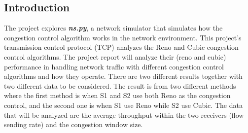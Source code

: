 \documentclass[12pt,a4paper]{report}
\begin{document}
\subsection*{Introduction}
\noindent The project explores \textit{\textbf{ns.py}}, a network simulator that simulates how the congestion control algorithm works in the network environment. This project's transmission control protocol (TCP) analyzes the Reno and Cubic congestion control algorithms. The project report will analyze their (reno and cubic) performance in handling network traffic with different congestion control algorithms and how they operate. There are two different results together with two different data to be considered. The result is from two different methods where the first method is when S1 and S2 use both Reno as the congestion control, and the second one is when S1 use Reno while S2 use Cubic. The data that will be analyzed are the average throughput within the two receivers (flow sending rate) and the congestion window size. 
\end{document}
